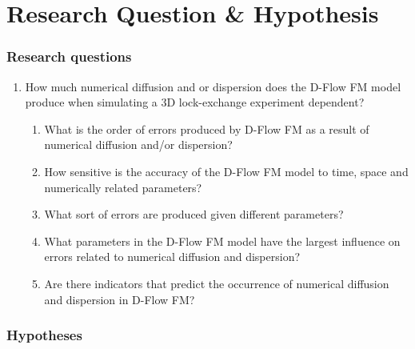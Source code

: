 \chapter{Research Question \&
Hypothesis}\label{research-question-hypothesis}

\subsection{Research questions}\label{research-questions}

\begin{enumerate}
\def\labelenumi{\arabic{enumi}.}
\tightlist
\item
  How much numerical diffusion and or dispersion does the D-Flow FM
  model produce when simulating a 3D lock-exchange experiment dependent?

  \begin{enumerate}
  \def\labelenumii{\arabic{enumii}.}
  \tightlist
  \item
    What is the order of errors produced by D-Flow FM as a result of
    numerical diffusion and/or dispersion?
  \item
    How sensitive is the accuracy of the D-Flow FM model to time, space
    and numerically related parameters?
  \item
    What sort of errors are produced given different parameters?
  \item
    What parameters in the D-Flow FM model have the largest influence on
    errors related to numerical diffusion and dispersion?
  \item
    Are there indicators that predict the occurrence of numerical
    diffusion and dispersion in D-Flow FM?
  \end{enumerate}
\end{enumerate}

\subsection{Hypotheses}\label{hypotheses}

